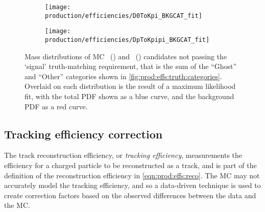 \begin{figure}
  \begin{subfigure}[b]{0.5\textwidth}
    \centering
    \texttt{[image: production/efficiencies/D0ToKpi\_BKGCAT\_fit]}
    \caption{\DzToKpi}
    \label{fig:prod:effs:truth:fit:D0ToKpi}
  \end{subfigure}
  \begin{subfigure}[b]{0.5\textwidth}
    \centering
    \texttt{[image: production/efficiencies/DpToKpipi\_BKGCAT\_fit]}
    \caption{\DpToKpipi}
    \label{fig:prod:effs:truth:fit:DpToKpipi}
  \end{subfigure}
  \caption{%
    Mass distributions of \ac{MC} 
    \PDzero~() and 
    \PDplus~() candidates not 
    passing the `signal' truth-matching requirement, that is the sum of the 
    ``Ghost'' and ``Other'' categories shown in 
    \cref{fig:prod:effs:truth:categories}.
    Overlaid on each distribution is the result of a maximum likelihood fit, 
    with the total \acl{PDF} shown as a blue curve, and the background 
    \acl{PDF} as a red curve.
  }
  \label{fig:prod:effs:truth:fit}
\end{figure}

\subsection{Tracking efficiency correction}
\label{chap:prod:effs:tracking}

The track reconstruction efficiency, or \emph{tracking efficiency}, 
measurements the efficiency for a charged particle to be reconstructed as a 
track, and is part of the definition of the reconstruction efficiency in 
\cref{eqn:prod:effs:reco}.
The \ac{MC} may not accurately model the tracking efficiency, and so a 
data-driven technique is used to create correction factors based on the 
observed differences between the data and the \ac{MC}.

